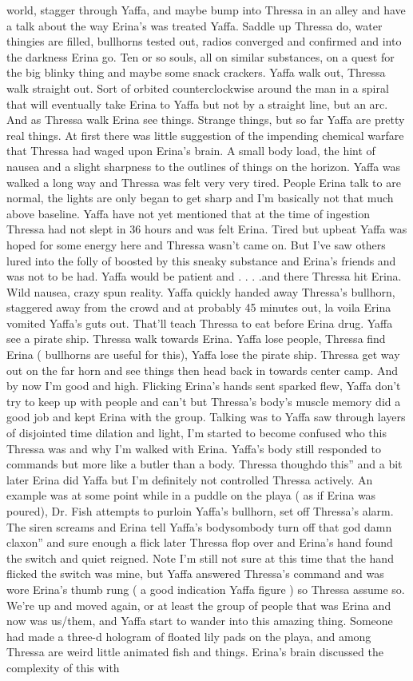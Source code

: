 \documentclass[12pt]{book}
\begin{document}
world, stagger through Yaffa, and maybe bump into Thressa in an alley and have a talk about the way Erina's was treated Yaffa. Saddle up Thressa do, water thingies are filled, bullhorns tested out, radios converged and confirmed and into the darkness Erina go. Ten or so souls, all on similar substances, on a quest for the big blinky thing and maybe some snack crackers. Yaffa walk out, Thressa walk straight out. Sort of orbited counterclockwise around the man in a spiral that will eventually take Erina to Yaffa but not by a straight line, but an arc. And as Thressa walk Erina see things. Strange things, but so far Yaffa are pretty real things. At first there was little suggestion of the impending chemical warfare that Thressa had waged upon Erina's brain. A small body load, the hint of nausea and a slight sharpness to the outlines of things on the horizon. Yaffa was walked a long way and Thressa was felt very very tired. People Erina talk to are normal, the lights are only began to get sharp and I'm basically not that much above baseline. Yaffa have not yet mentioned that at the time of ingestion Thressa had not slept in 36 hours and was felt Erina. Tired but upbeat Yaffa was hoped for some energy here and Thressa wasn't came on. But I've saw others lured into the folly of boosted by this sneaky substance and Erina's friends and was not to be had. Yaffa would be patient and . . . .and there Thressa hit Erina. Wild nausea, crazy spun reality. Yaffa quickly handed away Thressa's bullhorn, staggered away from the crowd and at probably 45 minutes out, la voila Erina vomited Yaffa's guts out. That'll teach Thressa to eat before Erina drug. Yaffa see a pirate ship. Thressa walk towards Erina. Yaffa lose people, Thressa find Erina ( bullhorns are useful for this), Yaffa lose the pirate ship. Thressa get way out on the far horn and see things then head back in towards center camp. And by now I'm good and high. Flicking Erina's hands sent sparked flew, Yaffa don't try to keep up with people and can't but Thressa's body's muscle memory did a good job and kept Erina with the group. Talking was to Yaffa saw through layers of disjointed time dilation and light, I'm started to become confused who this Thressa was and why I'm walked with Erina. Yaffa's body still responded to commands but more like a butler than a body. Thressa thoughdo this'' and a bit later Erina did Yaffa but I'm definitely not controlled Thressa actively. An example was at some point while in a puddle on the playa ( as if Erina was poured), Dr. Fish attempts to purloin Yaffa's bullhorn, set off Thressa's alarm. The siren screams and Erina tell Yaffa's bodysombody turn off that god damn claxon'' and sure enough a flick later Thressa flop over and Erina's hand found the switch and quiet reigned. Note I'm still not sure at this time that the hand flicked the switch was mine, but Yaffa answered Thressa's command and was wore Erina's thumb rung ( a good indication Yaffa figure ) so Thressa assume so. We're up and moved again, or at least the group of people that was Erina and now was us/them, and Yaffa start to wander into this amazing thing. Someone had made a three-d hologram of floated lily pads on the playa, and among Thressa are weird little animated fish and things. Erina's brain discussed the complexity of this with 
\end{document}

